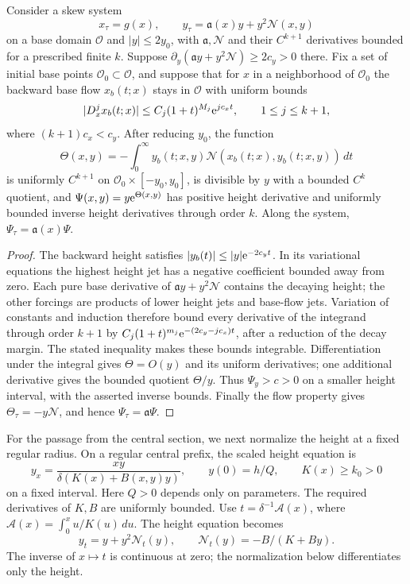 \begin{lemma}
\label{lem:direct-contracting-height-coordinate}
Consider a skew system
\[
 x_\tau=g(x),\qquad y_\tau=\mathfrak a(x)y+y^2\mathcal N(x,y)
\]
on a base domain \(\mathcal O\) and \(|y|\le2y_0\), with \(\mathfrak a,\mathcal N\) and
their \(C^{k+1}\) derivatives bounded for a prescribed finite
\(k\). Suppose \(\partial_y(\mathfrak a y+y^2\mathcal N)\ge2c_y>0\) there. Fix a set
of initial base points \(\mathcal O_0\subset\mathcal O\), and suppose
that for \(x\) in a neighborhood of \(\mathcal O_0\) the backward base
flow \(x_b(t;x)\) stays in \(\mathcal O\) with uniform bounds
\[
 |D_x^j x_b(t;x)|\le C_j(1+t)^{M_j}\mathrm e^{jc_x t},
 \qquad 1\le j\le k+1,
\]
where \((k+1)c_x<c_y\). After reducing \(y_0\), the
function
\[
 \Theta(x,y)=-\int_0^\infty
      y_b(t;x,y)\mathcal N(x_b(t;x),y_b(t;x,y))\,dt
\]
is uniformly \(C^{k+1}\) on \(\mathcal O_0\times[-y_0,y_0]\), is divisible
by \(y\) with a bounded
\(C^k\) quotient, and
\(\Psi(x,y)=y \mathrm e^{\Theta(x,y)}\) has positive height derivative and
uniformly bounded inverse height derivatives through order \(k\).
Along the system, \(\Psi_\tau=\mathfrak a(x)\Psi\).
\end{lemma}

\begin{proof}
The backward height satisfies \(|y_b(t)|\le |y|\mathrm e^{-2c_y t}\).
In its variational equations the highest height jet has a negative
coefficient bounded away from zero. Each pure base derivative of
\(\mathfrak a y+y^2\mathcal N\) contains the decaying height; the other forcings are
products of lower height jets and base-flow jets. Variation of
constants and induction therefore bound every derivative of the
integrand through order \(k+1\) by
\(C_j(1+t)^{m_j}\mathrm e^{-(2c_y-jc_x)t}\), after a
reduction of the decay margin. The stated inequality makes these
bounds integrable. Differentiation under the integral gives
\(\Theta=O(y)\) and its uniform derivatives; one additional derivative
gives the bounded quotient \(\Theta/y\). Thus \(\Psi_y>c>0\) on a
smaller height interval, with the asserted inverse bounds.
Finally the flow property gives \(\Theta_\tau=-y\mathcal N\), and hence
\(\Psi_\tau=\mathfrak a\Psi\).
\end{proof}

For the passage from the central section, we next normalize the height
at a fixed regular radius. On a regular central prefix, the scaled
height equation is
\begin{equation}
\label{eq:direct-source-prefix}
 y_x=\frac{xy}{\delta(K(x)+B(x,y)y)},\qquad
 y(0)=h/Q,\qquad K(x)\ge k_0>0
\end{equation}
on a fixed interval. Here \(Q>0\) depends only on parameters.
The required derivatives of \(K,B\) are uniformly bounded.
Use \(t=\delta^{-1}\mathcal A(x)\), where
\(\mathcal A(x)=\int_0^x u/K(u)\,du\). The height equation becomes
\[
 y_t=y+y^2\mathcal N_t(y),\qquad
 \mathcal N_t(y)=-B/(K+By).
\]
The inverse of \(x\mapsto t\) is continuous at zero; the normalization below
differentiates only the height.

